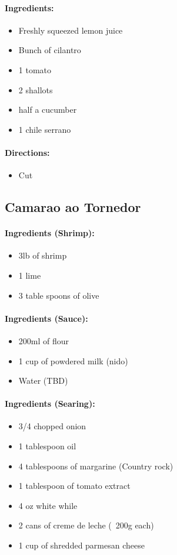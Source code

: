 \documentclass{article}
\begin{document}
\paragraph{Ingredients:}
\begin{itemize}
    \item Freshly squeezed lemon juice
    \item Bunch of cilantro
    \item 1 tomato
    \item 2 shallots
    \item half a cucumber
    \item 1 chile serrano
\end{itemize}

\paragraph{Directions:}
\begin{itemize}
    \item Cut
\end{itemize}

\subsection{Camarao ao Tornedor} 

\paragraph{Ingredients (Shrimp):}
\begin{itemize}
    \item 3lb of shrimp
    \item 1 lime
    \item 3 table spoons of olive
\end{itemize}  

\paragraph{Ingredients (Sauce):}
\begin{itemize}
    \item 200ml of flour
    \item 1 cup of powdered milk (nido)
    \item Water (TBD)
\end{itemize}  

\paragraph{Ingredients (Searing):}
\begin{itemize}
    \item 3/4 chopped onion
    \item 1 tablespoon oil
    \item 4 tablespoons of margarine (Country rock)
    \item 1 tablespoon of tomato extract
    \item 4 oz white while
    \item 2 cans of creme de leche (~200g each)
    \item 1 cup of shredded parmesan cheese
\end{itemize}  
\end{document}

